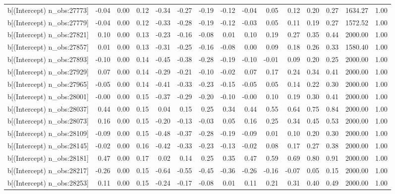\begin{table}[ht]
\begin{tabular}{rrrrrrrrrrrrrrr}
  b[(Intercept) n\_obs:27773] & -0.04 & 0.00 & 0.12 & -0.34 & -0.27 & -0.19 & -0.12 & -0.04 & 0.05 & 0.12 & 0.20 & 0.27 & 1634.27 & 1.00 \\ 
  b[(Intercept) n\_obs:27779] & -0.04 & 0.00 & 0.12 & -0.33 & -0.28 & -0.19 & -0.12 & -0.03 & 0.05 & 0.11 & 0.19 & 0.27 & 1572.52 & 1.00 \\ 
  b[(Intercept) n\_obs:27821] & 0.10 & 0.00 & 0.13 & -0.23 & -0.16 & -0.08 & 0.01 & 0.10 & 0.19 & 0.27 & 0.35 & 0.44 & 2000.00 & 1.00 \\ 
  b[(Intercept) n\_obs:27857] & 0.01 & 0.00 & 0.13 & -0.31 & -0.25 & -0.16 & -0.08 & 0.00 & 0.09 & 0.18 & 0.26 & 0.33 & 1580.40 & 1.00 \\ 
  b[(Intercept) n\_obs:27893] & -0.10 & 0.00 & 0.14 & -0.45 & -0.38 & -0.28 & -0.19 & -0.10 & -0.01 & 0.09 & 0.20 & 0.25 & 2000.00 & 1.00 \\ 
  b[(Intercept) n\_obs:27929] & 0.07 & 0.00 & 0.14 & -0.29 & -0.21 & -0.10 & -0.02 & 0.07 & 0.17 & 0.24 & 0.34 & 0.41 & 2000.00 & 1.00 \\ 
  b[(Intercept) n\_obs:27965] & -0.05 & 0.00 & 0.14 & -0.41 & -0.33 & -0.23 & -0.15 & -0.05 & 0.05 & 0.14 & 0.22 & 0.30 & 2000.00 & 1.00 \\ 
  b[(Intercept) n\_obs:28001] & -0.00 & 0.00 & 0.15 & -0.37 & -0.29 & -0.20 & -0.10 & -0.00 & 0.10 & 0.19 & 0.30 & 0.41 & 2000.00 & 1.00 \\ 
  b[(Intercept) n\_obs:28037] & 0.44 & 0.00 & 0.15 & 0.04 & 0.15 & 0.25 & 0.34 & 0.44 & 0.55 & 0.64 & 0.75 & 0.84 & 2000.00 & 1.00 \\ 
  b[(Intercept) n\_obs:28073] & 0.16 & 0.00 & 0.15 & -0.20 & -0.13 & -0.03 & 0.05 & 0.16 & 0.25 & 0.34 & 0.45 & 0.53 & 2000.00 & 1.00 \\ 
  b[(Intercept) n\_obs:28109] & -0.09 & 0.00 & 0.15 & -0.48 & -0.37 & -0.28 & -0.19 & -0.09 & 0.01 & 0.10 & 0.20 & 0.30 & 2000.00 & 1.00 \\ 
  b[(Intercept) n\_obs:28145] & -0.02 & 0.00 & 0.16 & -0.42 & -0.33 & -0.23 & -0.13 & -0.02 & 0.08 & 0.17 & 0.27 & 0.38 & 2000.00 & 1.00 \\ 
  b[(Intercept) n\_obs:28181] & 0.47 & 0.00 & 0.17 & 0.02 & 0.14 & 0.25 & 0.35 & 0.47 & 0.59 & 0.69 & 0.80 & 0.91 & 2000.00 & 1.00 \\ 
  b[(Intercept) n\_obs:28217] & -0.26 & 0.00 & 0.15 & -0.64 & -0.55 & -0.45 & -0.36 & -0.26 & -0.16 & -0.07 & 0.05 & 0.15 & 2000.00 & 1.00 \\ 
  b[(Intercept) n\_obs:28253] & 0.11 & 0.00 & 0.15 & -0.24 & -0.17 & -0.08 & 0.01 & 0.11 & 0.21 & 0.31 & 0.40 & 0.49 & 2000.00 & 1.00 \\ 

\end{tabular}
\end{table}
